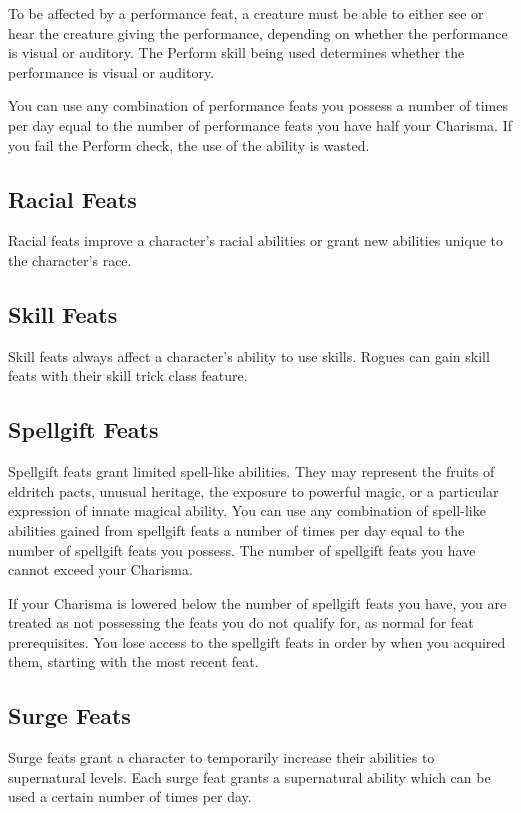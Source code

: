 To be affected by a performance feat, a creature must be able to either see or hear the creature giving the performance, depending on whether the performance is visual or auditory. The Perform skill being used determines whether the performance is visual or auditory.

You can use any combination of performance feats you possess a number of times per day equal to the number of performance feats you have \add half your Charisma. If you fail the Perform check, the use of the ability is wasted.

\subsection{Racial Feats}\label{Racial Feats}
Racial feats improve a character's racial abilities or grant new abilities unique to the character's race.

\subsection{Skill Feats}
Skill feats always affect a character's ability to use skills. Rogues can gain skill feats with their skill trick class feature.

\subsection{Spellgift Feats}
Spellgift feats grant limited spell-like abilities. They may represent the fruits of eldritch pacts, unusual heritage, the exposure to powerful magic, or a particular expression of innate magical ability. You can use any combination of spell-like abilities gained from spellgift feats a number of times per day equal to the number of spellgift feats you possess. The number of spellgift feats you have cannot exceed your Charisma.

If your Charisma is lowered below the number of spellgift feats you have, you are treated as not possessing the feats you do not qualify for, as normal for feat prerequisites. You lose access to the spellgift feats in order by when you acquired them, starting with the most recent feat.

\subsection{Surge Feats}
Surge feats grant a character to temporarily increase their abilities to supernatural levels. Each surge feat grants a supernatural ability which can be used a certain number of times per day.

